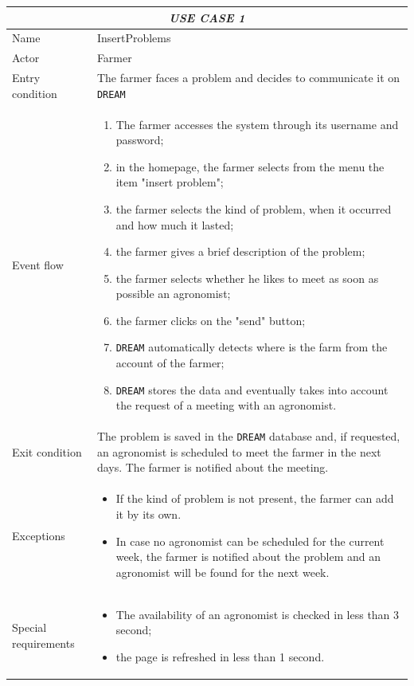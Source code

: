 \documentclass{article}
\begin{document}
\begin{longtable}{|p{3.5cm}|m{8cm}|}
 \hline
 \multicolumn{2}{|c|}{\cellcolor{white}\emph{USE CASE 1}} \\
 \endfirsthead
 \endhead
 \endfoot
 \endlastfoot
 \hline
 Name & InsertProblems\\
 \hline
 Actor & Farmer\\
 \hline
 Entry condition & The farmer faces a problem and decides to communicate it on \verb|DREAM|\\
 \hline
 Event flow & \begin{enumerate}
    \item The farmer accesses the system through its username and password;
    \item in the homepage, the farmer selects from the menu the item "insert problem";
    \item the farmer selects the kind of problem, when it occurred and how much it lasted;
    \item the farmer gives a brief description of the problem;
    \item the farmer selects whether he likes to meet as soon as possible an agronomist;
    \item the farmer clicks on the "send" button;
    \item \verb|DREAM| automatically detects where is the farm from the account of the farmer;
    \item \verb|DREAM| stores the data and eventually takes into account the request of a meeting with an agronomist.
 \end{enumerate}\\
 \hline
 Exit condition & The problem is saved in the \verb|DREAM| database and, if requested, an agronomist is scheduled to meet the farmer in the next days. The farmer is notified about the meeting.\\
 \hline
 Exceptions & \begin{itemize}
     \item If the kind of problem is not present, the farmer can add it by its own.
     \item In case no agronomist can be scheduled for the current week, the farmer is notified about the problem and an agronomist will be found for the next week.
 \end{itemize}\\
 \hline
 Special requirements & \begin{itemize}
     \item The availability of an agronomist is checked in less than 3 second;
     \item the page is refreshed in less than 1 second.
 \end{itemize}\\
 \hline
\end{longtable}
\end{document}
